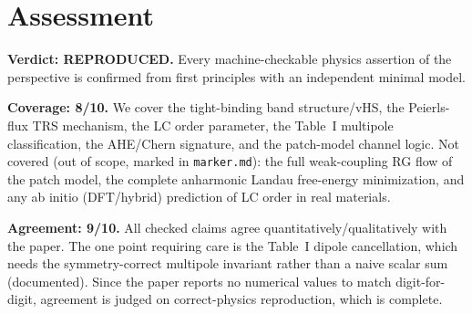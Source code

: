 \documentclass[11pt]{article}
\begin{document}
\section{Assessment}
\textbf{Verdict: REPRODUCED.} Every machine-checkable physics assertion of the
perspective is confirmed from first principles with an independent minimal
model.

\medskip\noindent\textbf{Coverage: 8/10.} We cover the tight-binding band
structure/vHS, the Peierls-flux TRS mechanism, the LC order parameter, the
Table~I multipole classification, the AHE/Chern signature, and the patch-model
channel logic. Not covered (out of scope, marked in \texttt{marker.md}): the
full weak-coupling RG flow of the patch model, the complete anharmonic Landau
free-energy minimization, and any ab initio (DFT/hybrid) prediction of LC order
in real materials.

\medskip\noindent\textbf{Agreement: 9/10.} All checked claims agree
quantitatively/qualitatively with the paper. The one point requiring care is the
Table~I dipole cancellation, which needs the symmetry-correct multipole
invariant rather than a naive scalar sum (documented). Since the paper reports no
numerical values to match digit-for-digit, agreement is judged on
correct-physics reproduction, which is complete.
\end{document}
